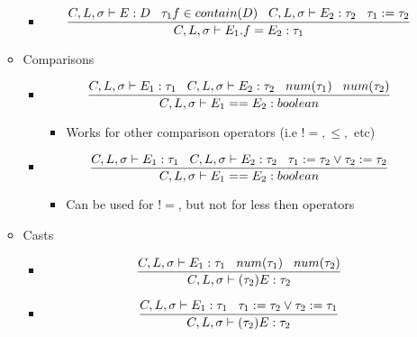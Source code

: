 \documentclass{article}
\begin{document}
\begin{itemize}
\begin{itemize}
\begin{itemize}
\item $$ \frac{C, L, \sigma \vdash E : D \hspace{0.3cm} \tau_1 f \in contain(D) \hspace{0.3cm} C, L, \sigma \vdash E_2 : \tau_2 \hspace{0.3cm} \tau_1 := \tau_2}{C, L, \sigma \vdash E_1.f = E_2 : \tau_1}$$
\end{itemize}
\item Comparisons
\begin{itemize}
\item $$ \frac{C, L, \sigma \vdash E_1 : \tau_1 \hspace{0.3cm} C, L, \sigma \vdash E_2 : \tau_2 \hspace{0.3cm} num(\tau_1) \hspace{0.3cm} num(\tau_2)}{C, L, \sigma \vdash E_1 == E_2 : boolean}$$
\begin{itemize}
\item Works for other comparison operators (i.e \(!= , \leq,\) etc) 
\end{itemize}
\item $$ \frac{C, L, \sigma \vdash E_1 : \tau_1 \hspace{0.3cm} C, L, \sigma \vdash E_2 : \tau_2 \hspace{0.3cm} \tau_1 := \tau_2 \vee \tau_2 := \tau_2 }{C, L, \sigma \vdash E_1 == E_2 : boolean}$$
\begin{itemize}
\item Can be used for \(!=\), but not for less then operators
\end{itemize}
\end{itemize}
\item Casts
\begin{itemize}
\item $$ \frac{C, L, \sigma \vdash E_1 : \tau_1 \hspace{0.3cm} num(\tau_1) \hspace{0.3cm} num(\tau_2)}{
C, L, \sigma \vdash (\tau_2) E  : \tau_2}$$
\item $$ \frac{C, L, \sigma \vdash E_1 : \tau_1 \hspace{0.3cm} \tau_1 := \tau_2 \vee \tau_2 := \tau_1}{C, L, \sigma \vdash (\tau_2) E : \tau_2}$$
\end{itemize}
\end{itemize}

\end{itemize}
\end{document}

